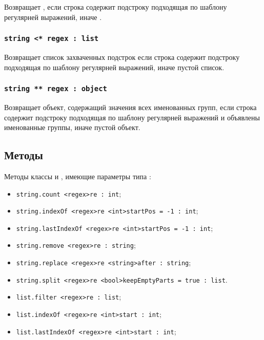 \documentclass[a4paper, 14pt]{extarticle}
\newenvironment{icItems}
	{ \begin{itemize} [noitemsep,nolistsep] }
	{ \end{itemize} }
\begin{document}
Возвращает \true{}, если строка содержит подстроку подходящая по шаблону регулярней выражений, иначе \false{}.

\subsubsection{\lstinline|string <* regex : list|}

Возвращает список захваченных подстрок если строка содержит подстроку подходящая по шаблону регулярней выражений, иначе пустой список.

\subsubsection{\lstinline|string ** regex : object|}

Возвращает объект, содержащий значения всех именованных групп, если строка содержит подстроку подходящая по шаблону регулярней выражений и объявлены именованные группы, иначе пустой объект.


\subsection{Методы}

Методы классы \str{} и \listtype, имеющие параметры типа \regex{}:
\begin{icItems}
\item
	\lstinline|string.count <regex>re : int|;
\item
	\lstinline|string.indexOf <regex>re <int>startPos = -1 : int|;
\item
	\lstinline|string.lastIndexOf <regex>re <int>startPos = -1 : int|;
\item
	\lstinline|string.remove <regex>re : string|;
\item 
	\lstinline|string.replace <regex>re <string>after : string|;
\item
	\lstinline|string.split <regex>re <bool>keepEmptyParts = true : list|.
\item
	\lstinline|list.filter <regex>re : list|;
\item
	\lstinline|list.indexOf <regex>re <int>start : int|;
\item
	\lstinline|list.lastIndexOf <regex>re <int>start : int|;
\end{icItems}
\end{document}

